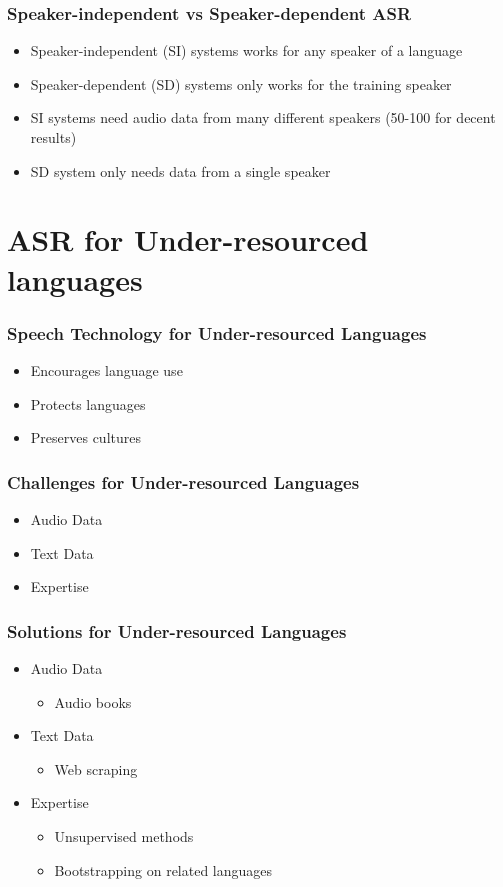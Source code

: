 \begin{frame}
\frametitle{Speaker-independent vs Speaker-dependent ASR}
\begin{itemize}
\item Speaker-independent (SI) systems works for any speaker of a language
\item Speaker-dependent (SD) systems  only works for the training speaker
\item SI systems need audio data from many different speakers (50-100 for decent results)
\item SD system only needs data from a single speaker
\end{itemize}
\end{frame}


\section[Under-resourced]{ASR for Under-resourced languages}
\begin{frame}
\frametitle{Speech Technology for Under-resourced Languages}
\begin{itemize}
\item Encourages language use
\item Protects languages
\item Preserves cultures
\end{itemize}
\end{frame}

\begin{frame}
\frametitle{Challenges for Under-resourced Languages}
\begin{itemize}
\item Audio Data
\item Text Data
\item Expertise
\end{itemize}
\end{frame}
%

\begin{frame}
\frametitle{Solutions for Under-resourced Languages}
\begin{itemize}
\item Audio Data
\begin{itemize}
\item Audio books
\end{itemize}
\item Text Data
\begin{itemize}
\item Web scraping
\end{itemize}
\item Expertise
\begin{itemize}
\item Unsupervised methods
\item Bootstrapping on related languages
\end{itemize}
\end{itemize}
\end{frame}


